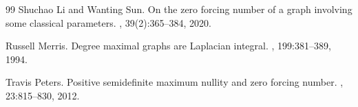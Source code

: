 \documentclass[3p,times,12pt]{article}
\begin{document}
\begin{thebibliography}{99}
Shuchao Li and Wanting Sun.
\newblock On the zero forcing number of a graph involving some classical
  parameters.
, 39(2):365--384, 2020.

Russell Merris.
\newblock Degree maximal graphs are {L}aplacian integral.
, 199:381--389, 1994.

Travis Peters.
\newblock Positive semidefinite maximum nullity and zero forcing number.
, 23:815--830, 2012.

\end{thebibliography}

%
%
%	
%	
\end{document}
